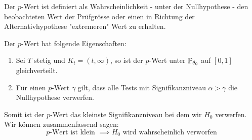 Der $p$-Wert ist definiert als Wahrscheinlichkeit - unter der Nullhypothese - den beobachteten Wert der Prüfgrösse oder einen in Richtung der Alternativhypothese "extremeren" Wert zu erhalten. \medskip

Der $p$-Wert hat folgende Eigenschaften:
\begin{enumerate}
    \item Sei $T$ stetig und $K_t = (t, \infty)$, so ist der $p$-Wert unter $\mathbb{P}_{\theta_0}$ auf $[0,1]$ gleichverteilt.
    \item Für einen $p$-Wert $\gamma$ gilt, dass alle Tests mit Signifikanzniveau $\alpha > \gamma$ die Nullhypothese verwerfen.
\end{enumerate}

Somit ist der $p$-Wert das kleinste Signifikanzniveau bei dem wir $H_0$ verwerfen. Wir können zusammenfassend sagen:
$$p\text{-Wert ist klein } \implies H_0 \text{ wird wahrscheinlich verworfen}$$

